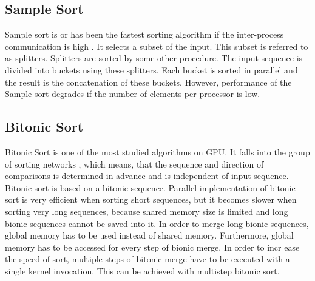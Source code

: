 \documentclass[journal]{IEEEtran}
\begin{document}
\subsection{Sample Sort}
Sample sort is or has been the fastest sorting algorithm if the inter-process communication is high . It selects a subset of the input. This subset is referred to as splitters. Splitters are sorted by some other procedure. The input sequence is divided into buckets using these splitters. Each bucket is sorted in parallel and the result is the concatenation of these buckets. However, performance of the Sample sort degrades if the number of elements per processor is low.

\subsection{Bitonic Sort}
Bitonic Sort is one of the most studied algorithms on GPU. It falls into the group of sorting networks , which means, that the sequence and direction of comparisons is determined in advance and is independent of input sequence. Bitonic sort is based on a bitonic sequence. Parallel implementation of bitonic sort is very efficient when sorting short sequences, but it becomes slower when sorting very long sequences, because shared memory size is limited and long bionic sequences cannot be saved into it. In order to merge long bionic sequences, global memory has to be used instead of shared memory. Furthermore, global memory has to be accessed for every step of bionic merge. In order to incr ease the speed of sort, multiple steps of bitonic merge have to be executed with a single kernel invocation. This can be achieved with multistep bitonic sort.\\

%
%
\end{document}
